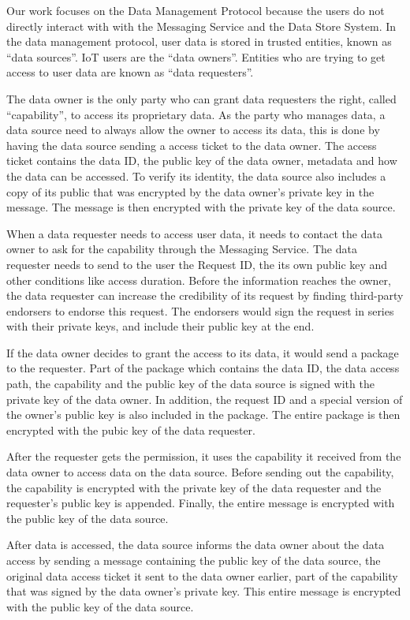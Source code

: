 Our work focuses on the Data Management Protocol because the users do not directly interact with with the Messaging Service and the Data Store System. In the data management protocol, user data is stored in trusted entities, known as ``data sources''. IoT users are the ``data owners''. Entities who are trying to get access to user data are known as ``data requesters''. 

The data owner is the only party who can grant data requesters the right, called ``capability'', to access its proprietary data. As the party who manages data, a data source need to always allow the owner to access its data, this is done by having the data source sending a access ticket to the data owner. The access ticket contains the data ID, the public key of the data owner, metadata and how the data can be accessed. To verify its identity, the data source also includes a copy of its public that was encrypted by the data owner’s private key in the message. The message is then encrypted with the private key of the data source.

When a data requester needs to access user data, it needs to contact the data owner to ask for the capability through the Messaging Service. The data requester needs to send to the user the Request ID, the its own public key and other conditions like access duration. Before the information reaches the owner, the data requester can increase the credibility of its request by finding third-party endorsers to endorse this request. The endorsers would sign the request in series with their private keys, and include their public key at the end.

If the data owner decides to grant the access to its data, it would send a package to the requester. Part of the package which contains the data ID, the data access path, the capability and the public key of the data source is signed with the private key of the data owner. In addition, the request ID and a special version of the owner’s public key is also included in the package. The entire package is then encrypted with the pubic key of the data requester.

After the requester gets the permission, it uses the capability it received from the data owner to access data on the data source. Before sending out the capability, the capability is encrypted with the private key of the data requester and the requester’s public key is appended. Finally, the entire message is encrypted with the public key of the data source.

After data is accessed, the data source informs the data owner about the data access by sending a message containing the public key of the data source, the original data access ticket it sent to the data owner earlier, part of the capability that was signed by the data owner’s private key. This entire message is encrypted with the public key of the data source.

